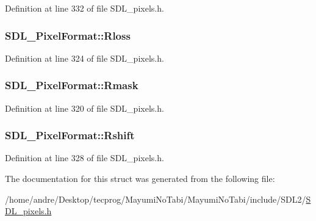 Definition at line 332 of file S\-D\-L\-\_\-pixels.\-h.

\hypertarget{struct_s_d_l___pixel_format_a9994b4ed87a2551253aebfa191db8424}{
\subsubsection[{Rloss}]{ S\-D\-L\-\_\-\-Pixel\-Format\-::\-Rloss}}\label{struct_s_d_l___pixel_format_a9994b4ed87a2551253aebfa191db8424}


Definition at line 324 of file S\-D\-L\-\_\-pixels.\-h.

\hypertarget{struct_s_d_l___pixel_format_a35e5793f6e9c356aec2d130167174946}{
\subsubsection[{Rmask}]{ S\-D\-L\-\_\-\-Pixel\-Format\-::\-Rmask}}\label{struct_s_d_l___pixel_format_a35e5793f6e9c356aec2d130167174946}


Definition at line 320 of file S\-D\-L\-\_\-pixels.\-h.

\hypertarget{struct_s_d_l___pixel_format_abfdec7b9ee2ee39db630f4022e4e0daa}{
\subsubsection[{Rshift}]{ S\-D\-L\-\_\-\-Pixel\-Format\-::\-Rshift}}\label{struct_s_d_l___pixel_format_abfdec7b9ee2ee39db630f4022e4e0daa}


Definition at line 328 of file S\-D\-L\-\_\-pixels.\-h.



The documentation for this struct was generated from the following file\-:\begin{DoxyCompactItemize}
\item 
/home/andre/\-Desktop/tecprog/\-Mayumi\-No\-Tabi/\-Mayumi\-No\-Tabi/include/\-S\-D\-L2/\hyperlink{_s_d_l__pixels_8h}{S\-D\-L\-\_\-pixels.\-h}\end{DoxyCompactItemize}
